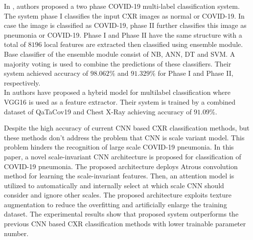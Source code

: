 In \cite{acos}, authors proposed a two phase COVID-19 multi-label classification system. The system phase I classifies the input CXR images as normal or COVID-19. In case the image  is classified as COVID-19, phase II further classifies this image as pneumonia or COVID-19. Phase I and Phase II have the same structure with a total of $8196$  local features are extracted then classified using ensemble module. Base classifier of the ensemble module consist of NB, ANN, DT and SVM. A majority voting is used to combine the predictions of these classifiers. Their system achieved accuracy of $98.062$\%  and $91.329$\% for Phase I and Phase II, respectively.\\
In \cite{hyp} authors have proposed a hybrid model for multilabel classification where VGG16 is used as a feature extractor. Their system is trained by a combined dataset of QaTaCov19 and Chest X-Ray achieving accuracy of $91.09$\%.

Despite the high accuracy of current CNN based CXR classification methods, but these methods don't address the problem that CNN is scale variant model. This problem hinders the recognition of large scale COVID-19 pneumonia. In this paper, a novel scale-invariant CNN architecture is proposed for classification of COVID-19 pneumonia. The proposed architecture deploys Atrous convolution method for learning the scale-invariant features. Then, an attention model is utilized to automatically and internally select at which scale  CNN should consider and ignore other scales. The proposed architecture exploits texture augmentation to reduce the overfitting and artificially enlarge the training dataset. The experimental results show that proposed system outperforms  the previous  CNN based CXR classification methods  with lower trainable parameter number.


